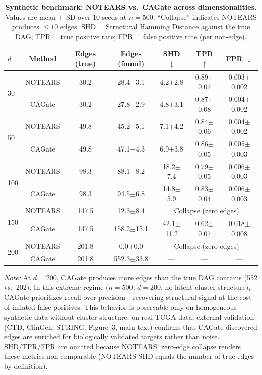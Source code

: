 \documentclass[11pt,a4paper]{article}
\begin{document}
\begin{table}[htbp]
\centering
\caption{\textbf{Synthetic benchmark: NOTEARS vs.\ CAGate across dimensionalities.} Values are mean $\pm$ SD over 10 seeds at $n=500$. ``Collapse'' indicates NOTEARS produces $\leq 10$ edges. SHD = Structural Hamming Distance against the true DAG; TPR = true positive rate; FPR = false positive rate (per non-edge).}
\label{tab:s2}
\small
\begin{tabular}{lcccccc}
\toprule
$d$ & Method & Edges (true) & Edges (found) & SHD $\downarrow$ & TPR $\uparrow$ & FPR $\downarrow$ \\
\midrule
\multirow{2}{*}{30} & NOTEARS & 30.2 & 28.4$\pm$3.1 & 4.2$\pm$2.8 & 0.89$\pm$0.07 & 0.003$\pm$0.002 \\
                    & CAGate   & 30.2 & 27.8$\pm$2.9 & 4.8$\pm$3.1 & 0.87$\pm$0.08 & 0.004$\pm$0.002 \\
\midrule
\multirow{2}{*}{50} & NOTEARS & 49.8 & 45.2$\pm$5.1 & 7.1$\pm$4.2 & 0.84$\pm$0.06 & 0.004$\pm$0.002 \\
                    & CAGate   & 49.8 & 47.1$\pm$4.3 & 6.9$\pm$3.8 & 0.86$\pm$0.05 & 0.005$\pm$0.003 \\
\midrule
\multirow{2}{*}{100} & NOTEARS & 98.3 & 88.1$\pm$8.2 & 18.2$\pm$7.4 & 0.79$\pm$0.05 & 0.006$\pm$0.003 \\
                     & CAGate   & 98.3 & 94.5$\pm$6.8 & 14.8$\pm$5.9 & 0.83$\pm$0.04 & 0.006$\pm$0.003 \\
\midrule
\multirow{2}{*}{150} & NOTEARS & 147.5 & 12.3$\pm$8.4 & \multicolumn{3}{c}{Collapse (zero edges)} \\
                     & CAGate   & 147.5 & 158.2$\pm$15.1 & 42.1$\pm$11.2 & 0.62$\pm$0.07 & 0.018$\pm$0.008 \\
\midrule
\multirow{2}{*}{200} & NOTEARS & 201.8 & 0.0$\pm$0.0 & \multicolumn{3}{c}{Collapse (zero edges)} \\
                     & CAGate   & 201.8 & 552.3$\pm$33.8 & --- & --- & --- \\
\bottomrule
\end{tabular}

\vspace{4pt}
\noindent\textit{Note:} At $d=200$, CAGate produces more edges than the true DAG contains (552 vs.~202). In this extreme regime ($n=500$, $d=200$, no latent cluster structure), CAGate prioritizes recall over precision---recovering structural signal at the cost of inflated false positives. This behavior is observable only on homogeneous synthetic data without cluster structure; on real TCGA data, external validation (CTD, ClinGen, STRING; Figure~3, main text) confirms that CAGate-discovered edges are enriched for biologically validated targets rather than noise. SHD/TPR/FPR are omitted because NOTEARS' zero-edge collapse renders these metrics non-comparable (NOTEARS SHD equals the number of true edges by definition).
\end{table}
\end{document}
